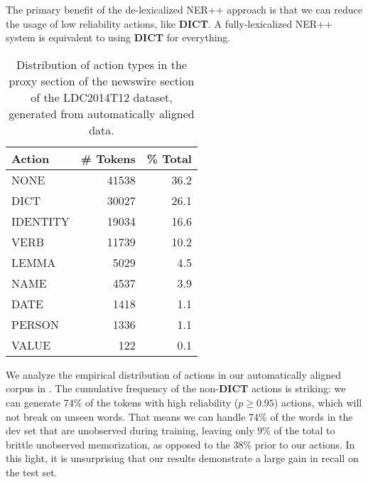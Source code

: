 \documentclass[11pt]{article}
\begin{document}

The primary benefit of the de-lexicalized NER++ approach is that we can reduce the usage of low reliability actions, like \textbf{DICT}. A fully-lexicalized NER++ system is equivalent to using \textbf{DICT} for everything.

%
%

\begin{table}[t]
\begin{center}
\begin{tabular}{l|rr}
\bf Action & \bf \# Tokens & \bf \% Total \\ \hline
NONE & 41538 & 36.2 \\
DICT & 30027 & 26.1 \\
IDENTITY & 19034 & 16.6 \\
VERB & 11739 & 10.2 \\
LEMMA & 5029 & 4.5 \\
NAME & 4537 & 3.9 \\
DATE & 1418 & 1.1 \\
PERSON & 1336 & 1.1 \\
VALUE & 122  & 0.1\\
\end{tabular}
\end{center}
\caption{\label{tab:distro} Distribution of action types in the proxy section of the newswire section of the LDC2014T12 dataset, generated from automatically aligned data. }
\end{table}

We analyze the empirical distribution of actions in our automatically aligned corpus in .
The cumulative frequency of the non-\textbf{DICT} actions is striking: we can generate 74\% of the tokens with high reliability ($p \geq 0.95$) actions, which will not break on unseen words.
That means we can handle 74\% of the words in the dev set that are unobserved during training, leaving only 9\% of the total to brittle unobserved memorization, as opposed to the 38\% prior to our actions.
In this light, it is unsurprising that our results demonstrate a large gain in recall on the test set.

\end{document}
